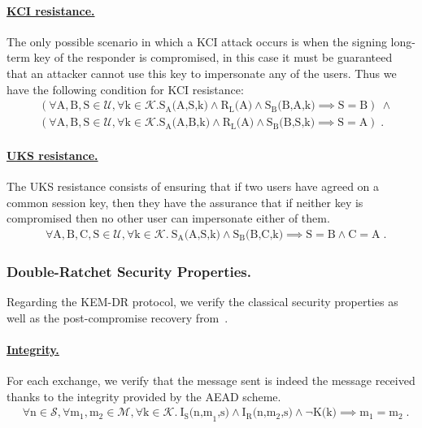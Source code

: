 \paragraph{\underline{KCI resistance.}} The only possible scenario in which a KCI attack occurs is when the signing long-term key of the responder is compromised, in this case it must be guaranteed that an attacker cannot use this key to impersonate any of the users. Thus we have the following condition for KCI resistance:
\begin{align*}
    & (\forall \text{A},\text{B},\text{S} \in \mathcal{U}, \forall \text{k} \in \mathcal{K}. \text{S}_\text{A}\text{(A,S,k)} \land \text{R}_\text{L}\text{(A)} \land \text{S}_\text{B}\text{(B,A,k)} \implies \text{S}=\text{B} ) ~\land \\
    & (\forall \text{A},\text{B},\text{S} \in \mathcal{U}, \forall \text{k} \in \mathcal{K}. \text{S}_\text{A}\text{(A,B,k)} \land \text{R}_\text{L}\text{(A)} \land \text{S}_\text{B}\text{(B,S,k)} \implies \text{S}=\text{A} ) \; .
\end{align*}

\paragraph{\underline{UKS resistance.}} The UKS resistance consists of ensuring that if two users have agreed on a common session key, then they have the assurance that if neither key is compromised then no other user can impersonate either of them.
\begin{align*}
    &\forall \text{A},\text{B},\text{C},\text{S} \in \mathcal{U}, \forall \text{k} \in \mathcal{K}.
    ~\text{S}_\text{A}\text{(A,S,k)} \land \text{S}_\text{B}\text{(B,C,k)} \implies \text{S}=\text{B} \land \text{C}=\text{A} \; .
\end{align*}

\subsubsection{Double-Ratchet Security Properties.} Regarding the KEM-DR protocol, we verify the classical security properties as well as the post-compromise recovery from~\cite{EC:AlwCorDod19}.

\paragraph{\underline{Integrity.}} For each exchange, we verify that the message sent is indeed the message received thanks to the integrity provided by the AEAD scheme.
\begin{align*}
    &\forall \text{n} \in \mathcal{S}, \forall \text{m}_\text{1}, \text{m}_\text{2} \in \mathcal{M}, \forall \text{k} \in \mathcal{K}.
    ~\text{I}_\text{S}\text{(n,m}_\text{1}\text{,s)} \land \text{I}_\text{R}\text{(n,}\text{m}_\text{2}\text{,s)} \land \lnot \text{K(k)} \implies \text{m}_\text{1}=\text{m}_\text{2} \; .
\end{align*}

